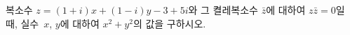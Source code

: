 복소수 $z=(1+i)x+(1-i)y-3+5i$와 그 켤레복소수 $\bar{z}$에 대하여 $z\bar{z}=0$일 때, 실수~$x$, $y$에 대하여 $x^2+y^2$의 값을 구하시오.
